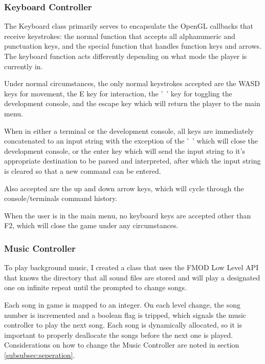 \documentclass{article}
\begin{document}
\subsubsection{Keyboard Controller} \label{subsubsec:keyboard}

The Keyboard class primarily serves to encapsulate the OpenGL callbacks that receive keystrokes: the normal function that accepts all alphanumeric and punctuation keys, and the special function that handles function keys and arrows. The keyboard function acts differently depending on what mode the player is currently in.

Under normal circumstances, the only normal keystrokes accepted are the WASD keys for movement, the E key for interaction, the '~' key for toggling the development console, and the escape key which will return the player to the main menu.

When in either a terminal or the development console, all keys are immediately concatenated to an input string with the exception of the '~' which will close the development console, or the enter key which will send the input string to it's appropriate destination to be parsed and interpreted, after which the input string is cleared so that a new command can be entered.

Also accepted are the up and down arrow keys, which will cycle through the console/terminals command history.

When the user is in the main menu, no keyboard keys are accepted other than F2, which will close the game under any circumstances.

\subsubsection{Music Controller} \label{subsubsec:musiccontroller}

To play background music, I created a class that uses the FMOD Low Level API that knows the directory that all sound files are stored and will play a designated one on infinite repeat until the prompted to change songs.

Each song in game is mapped to an integer. On each level change, the song number is incremented and a boolean flag is tripped, which signals the music controller to play the next song. Each song is dynamically allocated, so it is important to properly deallocate the songs before the next one is played. Considerations on how to change the Music Controller are noted in section \ref{subsubsec:seperation}.
\end{document}
